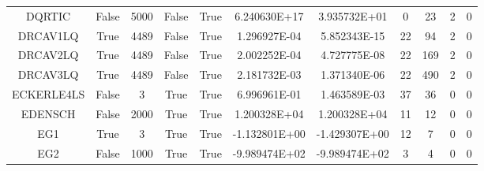 \begin{longtable}{ccccccccccc}
	\cellcolor{default1} DQRTIC& \cellcolor{default1} False& \cellcolor{default1} 5000& \cellcolor{default1} False& \cellcolor{default1} True& \cellcolor{poor} 6.240630E+17& \cellcolor{best} 3.935732E+01& \cellcolor{best} 0& \cellcolor{poor} 23& \cellcolor{default1} 2& \cellcolor{default1} 0\\
	\cellcolor{default2} DRCAV1LQ& \cellcolor{default2} True& \cellcolor{default2} 4489& \cellcolor{default2} False& \cellcolor{default2} True& \cellcolor{poor} 1.296927E-04& \cellcolor{best} 5.852343E-15& \cellcolor{best} 22& \cellcolor{poor} 94& \cellcolor{default2} 2& \cellcolor{default2} 0\\
	\cellcolor{default1} DRCAV2LQ& \cellcolor{default1} True& \cellcolor{default1} 4489& \cellcolor{default1} False& \cellcolor{default1} True& \cellcolor{poor} 2.002252E-04& \cellcolor{best} 4.727775E-08& \cellcolor{best} 22& \cellcolor{poor} 169& \cellcolor{default1} 2& \cellcolor{default1} 0\\
	\cellcolor{default2} DRCAV3LQ& \cellcolor{default2} True& \cellcolor{default2} 4489& \cellcolor{default2} False& \cellcolor{default2} True& \cellcolor{poor} 2.181732E-03& \cellcolor{best} 1.371340E-06& \cellcolor{best} 22& \cellcolor{poor} 490& \cellcolor{default2} 2& \cellcolor{default2} 0\\
	\cellcolor{default1} ECKERLE4LS& \cellcolor{default1} False& \cellcolor{default1} 3& \cellcolor{default1} True& \cellcolor{default1} True& \cellcolor{poor} 6.996961E-01& \cellcolor{best} 1.463589E-03& \cellcolor{ok} 37& \cellcolor{best} 36& \cellcolor{default1} 0& \cellcolor{default1} 0\\
	\cellcolor{default2} EDENSCH& \cellcolor{default2} False& \cellcolor{default2} 2000& \cellcolor{default2} True& \cellcolor{default2} True& \cellcolor{ok} 1.200328E+04& \cellcolor{best} 1.200328E+04& \cellcolor{best} 11& \cellcolor{ok} 12& \cellcolor{default2} 0& \cellcolor{default2} 0\\
	\cellcolor{default1} EG1& \cellcolor{default1} True& \cellcolor{default1} 3& \cellcolor{default1} True& \cellcolor{default1} True& \cellcolor{poor} -1.132801E+00& \cellcolor{best} -1.429307E+00& \cellcolor{ok} 12& \cellcolor{best} 7& \cellcolor{default1} 0& \cellcolor{default1} 0\\
	\cellcolor{default2} EG2& \cellcolor{default2} False& \cellcolor{default2} 1000& \cellcolor{default2} True& \cellcolor{default2} True& \cellcolor{ok} -9.989474E+02& \cellcolor{best} -9.989474E+02& \cellcolor{best} 3& \cellcolor{ok} 4& \cellcolor{default2} 0& \cellcolor{default2} 0\\

\end{longtable}
